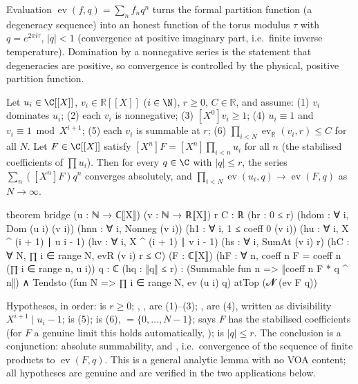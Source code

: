 \begin{physics}
Evaluation $\operatorname{ev}(f,q)=\sum_n f_nq^n$ turns the formal partition function (a degeneracy sequence) into an honest function of the torus modulus $\tau$ with $q=e^{2\pi i\tau}$, $|q|<1$ (convergence at positive imaginary part, i.e.\ finite inverse temperature). Domination by a nonnegative series is the statement that degeneracies are positive, so convergence is controlled by the physical, positive partition function.
\end{physics}

\begin{theorem}\label{ch05:thm:bridge}
Let $u_i\in\C[[X]]$, $v_i\in\mathbb R[[X]]$ ($i\in\N$), $r\ge0$, $C\in\mathbb R$, and assume:
(1) $v_i$ dominates $u_i$; (2) each $v_i$ is nonnegative; (3) $[X^0]v_i\ge1$; (4) $u_i\equiv1$ and
$v_i\equiv1\bmod X^{i+1}$; (5) each $v_i$ is summable at $r$; (6) $\prod_{i<N}\operatorname{ev}_{\mathbb
R}(v_i,r)\le C$ for all $N$. Let $F\in\C[[X]]$ satisfy $[X^n]F = [X^n]\prod_{i<n}u_i$ for all $n$
(the stabilised coefficients of $\prod u_i$). Then for every $q\in\C$ with $|q|\le r$, the series
$\sum_n([X^n]F)q^n$ converges absolutely, and $\prod_{i<N}\operatorname{ev}(u_i,q)\to\operatorname{ev}(F,q)$ as
$N\to\infty$.
\end{theorem}
\begin{leancode}
theorem bridge (u : ℕ → ℂ⟦X⟧) (v : ℕ → ℝ⟦X⟧) {r C : ℝ} (hr : 0 ≤ r)
    (hdom : ∀ i, Dom (u i) (v i)) (hnn : ∀ i, Nonneg (v i)) (h1 : ∀ i, 1 ≤ coeff 0 (v i))
    (hu : ∀ i, X ^ (i + 1) ∣ u i - 1) (hv : ∀ i, X ^ (i + 1) ∣ v i - 1)
    (hs : ∀ i, SumAt (v i) r) (hC : ∀ N, ∏ i ∈ range N, evR (v i) r ≤ C)
    (F : ℂ⟦X⟧) (hF : ∀ n, coeff n F = coeff n (∏ i ∈ range n, u i)) {q : ℂ} (hq : ‖q‖ ≤ r) :
    (Summable fun n => ‖coeff n F * q ^ n‖)
      ∧ Tendsto (fun N => ∏ i ∈ range N, ev (u i) q) atTop (𝓝 (ev F q))
\end{leancode}
\begin{dictionary}
Hypotheses, in order:  is $r\ge0$; , ,  are (1)--(3);
,  are (4), written as divisibility $X^{i+1}\mid u_i - 1$;  is (5); 
is (6),  $=\{0,\dots,N-1\}$;  says $F$ has the stabilised coefficients (for
$F$ a genuine  limit this holds automatically, );  is
$|q|\le r$. The conclusion is a conjunction: absolute summability, and ,
i.e.\ convergence of the sequence of finite products to $\operatorname{ev}(F,q)$. This is a general analytic
lemma with no VOA content; all hypotheses are genuine and are verified in the two applications below.
\end{dictionary}

